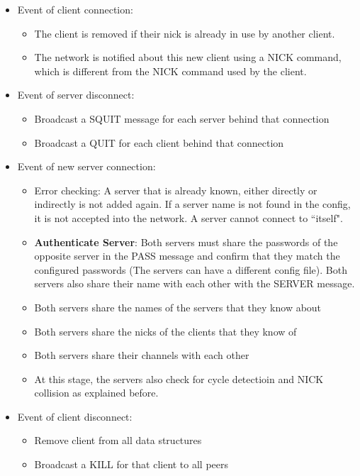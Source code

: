 \documentclass[letterpaper,twocolumn,10pt]{article}
\begin{document}
\begin{itemize}
    \item Event of client connection:
        \begin{itemize}
            \item The client is removed if their nick is already in use by another client.
            \item The network is notified about this new client using a NICK command, 
                which is different from the NICK command used by the client.
        \end{itemize}
	\item Event of server disconnect:
	      \begin{itemize}
		      \item Broadcast a SQUIT message for each server
		            behind that connection
		      \item Broadcast a QUIT for each client behind that
		            connection
	      \end{itemize}

	\item Event of new server connection:
	      \begin{itemize}
              \item Error checking: A server that is already known, either directly or 
                  indirectly is not added again. If a server name is not found in the config,
                  it is not accepted into the network. A server cannot connect to ``itself".
              \item \textbf{Authenticate Server}: Both servers must share the passwords of the
		            opposite server in the PASS message and confirm that they match the configured
                    passwords (The servers can have a different config file). 
                    Both servers also share their name with each other with the
		            SERVER message.
		      \item Both servers share the names of the servers that they know about
		      \item Both servers share the nicks of the clients that they know of
		      \item Both servers share their channels with each other
		      \item At this stage, the servers also check for cycle detectioin and NICK collision
		            as explained before.
	      \end{itemize}

	\item Event of client disconnect:
	      \begin{itemize}
		      \item Remove client from all data structures
		      \item Broadcast a KILL for that client to all peers
	      \end{itemize}

\end{itemize}
\end{document}
